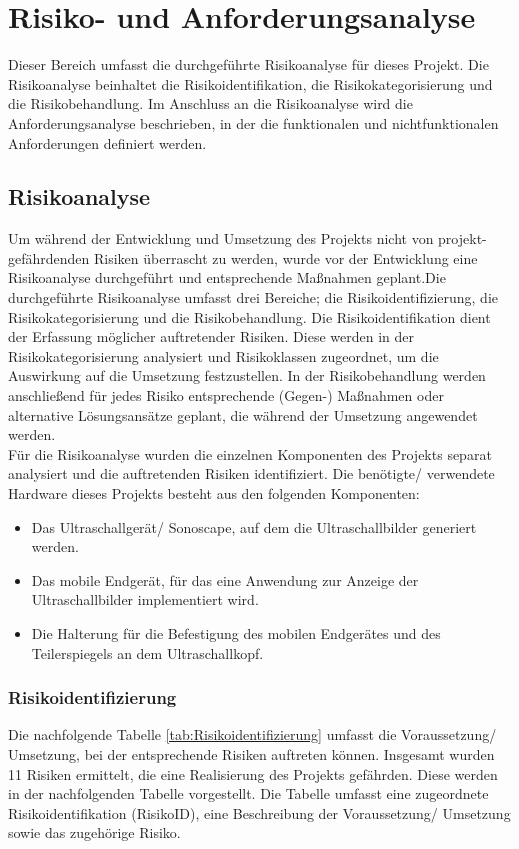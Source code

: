 \chapter{Risiko- und Anforderungsanalyse}
Dieser Bereich umfasst die durchgeführte Risikoanalyse für dieses Projekt. Die Risikoanalyse beinhaltet die Risikoidentifikation, die Risikokategorisierung und die Risikobehandlung. Im Anschluss an die Risikoanalyse wird die Anforderungsanalyse beschrieben, in der die funktionalen und nichtfunktionalen Anforderungen definiert werden. 
\section{Risikoanalyse}
Um während der Entwicklung und Umsetzung des Projekts nicht von projekt- \linebreak 
gefährdenden Risiken überrascht zu werden, wurde vor der Entwicklung eine Risikoanalyse durchgeführt und entsprechende Maßnahmen geplant.Die durchgeführte Risikoanalyse umfasst drei Bereiche; die Risikoidentifizierung, die Risikokategorisierung und die Risikobehandlung. Die Risikoidentifikation dient der Erfassung möglicher auftretender Risiken. Diese werden in der Risikokategorisierung analysiert und Risikoklassen zugeordnet, um die Auswirkung auf die Umsetzung festzustellen. In der Risikobehandlung werden anschließend für jedes Risiko entsprechende (Gegen-) Maßnahmen oder alternative Lösungsansätze geplant, die während der Umsetzung angewendet werden.\\
Für die Risikoanalyse wurden die einzelnen Komponenten des Projekts separat analysiert und die auftretenden Risiken identifiziert. Die benötigte/ verwendete Hardware dieses Projekts besteht aus den folgenden Komponenten:
\begin{itemize}
\item Das Ultraschallgerät/ Sonoscape, auf dem die Ultraschallbilder generiert werden.
\item Das mobile Endgerät, für das eine Anwendung zur Anzeige der Ultraschallbilder implementiert wird.
\item Die Halterung für die Befestigung des mobilen Endgerätes und des Teilerspiegels an dem Ultraschallkopf.
\end{itemize}

\subsection{Risikoidentifizierung}
Die nachfolgende Tabelle \ref{tab:Risikoidentifizierung} umfasst die Voraussetzung/ Umsetzung, bei der entsprechende Risiken auftreten können. Insgesamt wurden 11 Risiken ermittelt, die eine Realisierung des Projekts gefährden. Diese werden in der nachfolgenden Tabelle vorgestellt. Die Tabelle umfasst eine zugeordnete Risikoidentifikation (RisikoID), eine Beschreibung der Voraussetzung/ Umsetzung sowie das zugehörige Risiko. 

